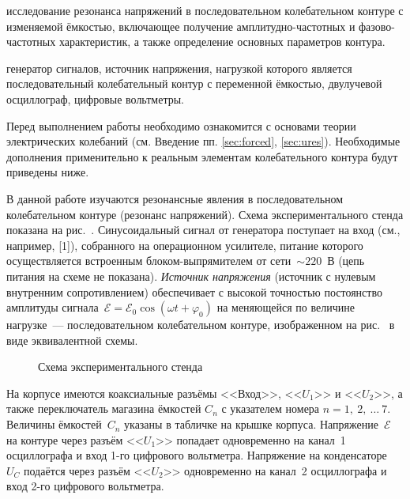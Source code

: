 
\begin{lab:aim}
     исследование резонанса напряжений в последовательном колебательном контуре
с изменяемой ёмкостью, включающее получение амплитудно-частотных и
фазово-частотных характеристик, а также определение основных параметров контура.
\end{lab:aim}

\begin{lab:equipment}
	генератор сигналов, источник напряжения, нагрузкой которого является
последовательный колебательный контур с переменной ёмкостью, двулучевой
осциллограф, цифровые вольтметры.
\end{lab:equipment}

Перед выполнением работы необходимо ознакомится с основами теории электрических  
колебаний (см. Введение пп. \ref{sec:forced}, \ref{sec:ures}).
Необходимые дополнения применительно к реальным элементам колебательного
контура будут приведены ниже.

\experiment

В данной работе изучаются резонансные явления в последовательном колебательном
контуре (резонанс напряжений). 
Схема экспериментального стенда показана на рис.~.
Синусоидальный сигнал от генератора поступает на вход  (см., например, [1]), собранного на
операционном усилителе, питание которого осуществляется встроенным
блоком-выпрямителем от сети~$\sim220$~В (цепь питания на схеме не показана).
\emph{Источник напряжения} (источник с нулевым внутренним
сопротивлением) обеспечивает с высокой точностью постоянство
амплитуды сигнала~$\mathcal{E}=\mathcal{E}_0\cos(\omega t+\varphi_0)$ на
меняющейся по величине нагрузке~--- последовательном колебательном контуре,
изображенном на рис.~ в виде эквивалентной схемы. 
\begin{figure}[h!]
	\caption{Схема экспериментального стенда}
\end{figure}

На корпусе имеются коаксиальные разъёмы <<Вход>>, <<$U_1$>> и <<$U_2$>>, а также
переключатель магазина ёмкостей $C_n$ с указателем номера $n=1,~2,~\ldots~7.$
Величины ёмкостей~$C_n$ указаны в табличке на крышке корпуса. 
Напряжение~$\mathcal{E}$ на контуре через разъём <<$U_1$>> попадает одновременно 
на канал~1 осциллографа и вход 1-го цифрового вольтметра. Напряжение на конденсаторе~$U_C$ 
подаётся через разъём <<$U_2$>> одновременно на канал~2 осциллографа и
вход 2-го цифрового вольтметра.

